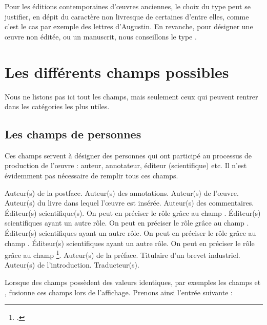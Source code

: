 Pour les éditions contemporaines d'œuvres anciennes, le choix du type  peut se justifier, en dépit du caractère non livresque de certaines d'entre elles, comme c'est le cas par exemple des lettres d'Augustin. En revanche, pour désigner  une œuvre non éditée, ou un manuscrit, nous conseillons le type .

\section{Les différents champs possibles}

Nous ne listons pas ici tout les champs, mais seulement ceux qui peuvent rentrer dans les catégories les plus utiles.
\subsection{Les champs de personnes}

Ces champs servent à désigner des personnes qui ont participé au processus de production de l'œuvre : auteur, annotateur, éditeur (scientifique) etc. Il n'est évidemment pas nécessaire de remplir tous ces champs.

\begin{fieldlist}
	 Auteur(s) de la postface. 
   	 Auteur(s) des annotations. 
   	 Auteur(s) de l'œuvre.    
   	 Auteur(s) du livre dans lequel l'œuvre est insérée. 
   	 Auteur(s) des commentaires. 
   	 Éditeur(s) scientifique(s). On peut en préciser le rôle grâce au champ .	
   	 Éditeur(s) scientifiques ayant un autre rôle. On peut en préciser le rôle grâce au champ .  
   	 Éditeur(s) scientifiques ayant un autre rôle. On peut en préciser le rôle  grâce au champ .  
   	 Éditeur(s) scientifiques ayant un autre rôle. On peut en préciser le rôle  grâce au champ \footcite[Pour ces quatres champs, se reporter à][]{biblatex_editortype}.
	 Auteur(s) de la préface.
   	 Titulaire d'un brevet industriel. 
   	 Auteur(s) de l'introduction. 
   	 Traducteur(s). 		
\end{fieldlist}

Lorsque des champs possèdent des valeurs identiques, par exemples les champs  et ,  fusionne ces champs lors de l'affichage. Prenons ainsi l'entrée suivante : 

